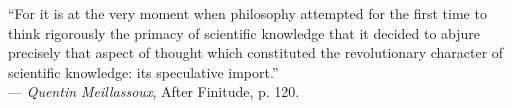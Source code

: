 
\begin{dedication}``For it is at the very moment when philosophy attempted for the first time to
	think rigorously the primacy of scientific knowledge that it decided to
	abjure precisely that aspect of thought which constituted the
	revolutionary character of scientific knowledge: its speculative
	import.'' \\
	--- \emph{Quentin Meillassoux}, After Finitude, p. 120.
\end{dedication}

